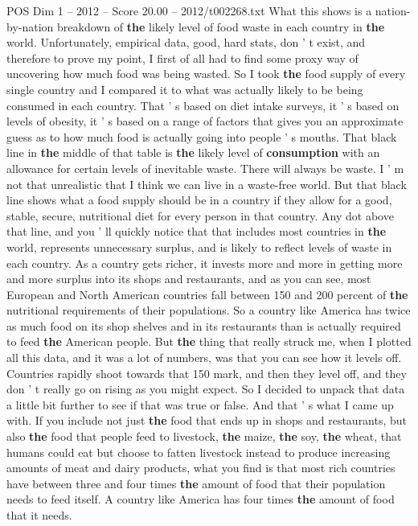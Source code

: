 \begin{textsample}{POS Dim 1 – 2012 – Score 20.00 – 2012/t002268.txt}
What this shows is a nation-by-nation breakdown of \textbf{the} likely level of food waste in each country in \textbf{the} world.
Unfortunately, empirical data, good, hard stats, don ' t exist, and therefore to prove my point, I first of all had to find some proxy way of uncovering how much food was being wasted.
So I took \textbf{the} food supply of every single country and I compared it to what was actually likely to be being consumed in each country.
That ' s based on diet intake surveys, it ' s based on levels of obesity, it ' s based on a range of factors that gives you an approximate guess as to how much food is actually going into people ' s mouths.
That black line in \textbf{the} middle of that table is \textbf{the} likely level of \textbf{consumption} with an allowance for certain levels of inevitable waste.
There will always be waste.
I ' m not that unrealistic that I think we can live in a waste-free world.
But that black line shows what a food supply should be in a country if they allow for a good, stable, secure, nutritional diet for every person in that country.
Any dot above that line, and you ' ll quickly notice that that includes most countries in \textbf{the} world, represents unnecessary surplus, and is likely to reflect levels of waste in each country.
As a country gets richer, it invests more and more in getting more and more surplus into its shops and restaurants, and as you can see, most European and North American countries fall between 150 and 200 percent of \textbf{the} nutritional requirements of their populations.
So a country like America has twice as much food on its shop shelves and in its restaurants than is actually required to feed \textbf{the} American people.
But \textbf{the} thing that really struck me, when I plotted all this data, and it was a lot of numbers, was that you can see how it levels off.
Countries rapidly shoot towards that 150 mark, and then they level off, and they don ' t really go on rising as you might expect.
So I decided to unpack that data a little bit further to see if that was true or false.
And that ' s what I came up with.
If you include not just \textbf{the} food that ends up in shops and restaurants, but also \textbf{the} food that people feed to livestock, \textbf{the} maize, \textbf{the} soy, \textbf{the} wheat, that humans could eat but choose to fatten livestock instead to produce increasing amounts of meat and dairy products, what you find is that most rich countries have between three and four times \textbf{the} amount of food that their population needs to feed itself.
A country like America has four times \textbf{the} amount of food that it needs.

\end{textsample}
